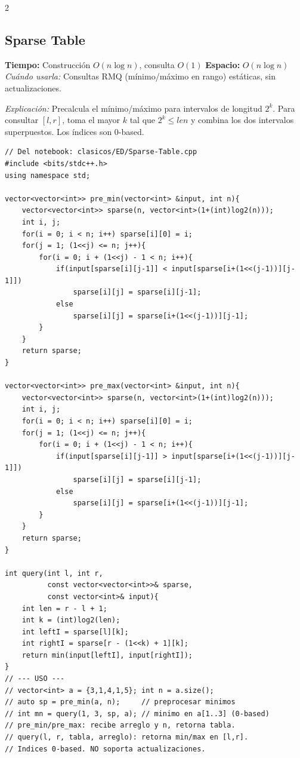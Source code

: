 \documentclass[10pt,a4paper]{article}
\begin{document}
\begin{multicols}{2}

\subsection{Sparse Table}
\textbf{Tiempo:} Construcci\'on $O(n \log n)$, consulta $O(1)$ \quad \textbf{Espacio:} $O(n \log n)$\\
\textit{Cu\'ando usarla:} Consultas RMQ (m\'inimo/m\'aximo en rango) est\'aticas, sin actualizaciones.

\textit{Explicación:} Precalcula el mínimo/máximo para intervalos de longitud $2^k$. Para consultar $[l,r]$, toma el mayor $k$ tal que $2^k \le len$ y combina los dos intervalos superpuestos. Los índices son 0-based.

\begin{lstlisting}
// Del notebook: clasicos/ED/Sparse-Table.cpp
#include <bits/stdc++.h>
using namespace std;

vector<vector<int>> pre_min(vector<int> &input, int n){
    vector<vector<int>> sparse(n, vector<int>(1+(int)log2(n)));
    int i, j;
    for(i = 0; i < n; i++) sparse[i][0] = i;
    for(j = 1; (1<<j) <= n; j++){
        for(i = 0; i + (1<<j) - 1 < n; i++){
            if(input[sparse[i][j-1]] < input[sparse[i+(1<<(j-1))][j-1]])
                sparse[i][j] = sparse[i][j-1];
            else
                sparse[i][j] = sparse[i+(1<<(j-1))][j-1];
        }
    }
    return sparse;
}

vector<vector<int>> pre_max(vector<int> &input, int n){
    vector<vector<int>> sparse(n, vector<int>(1+(int)log2(n)));
    int i, j;
    for(i = 0; i < n; i++) sparse[i][0] = i;
    for(j = 1; (1<<j) <= n; j++){
        for(i = 0; i + (1<<j) - 1 < n; i++){
            if(input[sparse[i][j-1]] > input[sparse[i+(1<<(j-1))][j-1]])
                sparse[i][j] = sparse[i][j-1];
            else
                sparse[i][j] = sparse[i+(1<<(j-1))][j-1];
        }
    }
    return sparse;
}

int query(int l, int r,
          const vector<vector<int>>& sparse,
          const vector<int>& input){
    int len = r - l + 1;
    int k = (int)log2(len);
    int leftI = sparse[l][k];
    int rightI = sparse[r - (1<<k) + 1][k];
    return min(input[leftI], input[rightI]);
}
// --- USO ---
// vector<int> a = {3,1,4,1,5}; int n = a.size();
// auto sp = pre_min(a, n);     // preprocesar minimos
// int mn = query(1, 3, sp, a); // minimo en a[1..3] (0-based)
// pre_min/pre_max: recibe arreglo y n, retorna tabla.
// query(l, r, tabla, arreglo): retorna min/max en [l,r].
// Indices 0-based. NO soporta actualizaciones.
\end{lstlisting}


\end{multicols}
\end{document}
